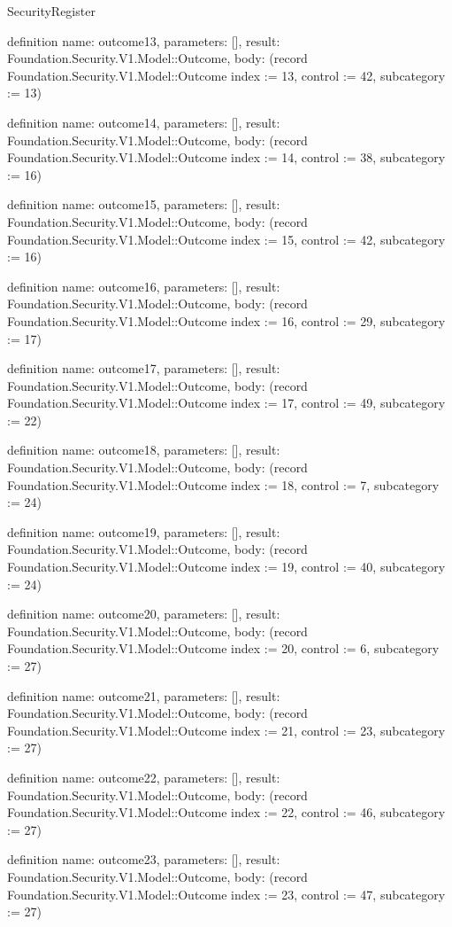 \begin{lexlean}{SecurityRegister}
\begin{semanticmodule}
definition{
  name: outcome13,
  parameters: [],
  result: Foundation.Security.V1.Model::Outcome,
  body: (record Foundation.Security.V1.Model::Outcome {index := 13, control := 42, subcategory := 13})
}

definition{
  name: outcome14,
  parameters: [],
  result: Foundation.Security.V1.Model::Outcome,
  body: (record Foundation.Security.V1.Model::Outcome {index := 14, control := 38, subcategory := 16})
}

definition{
  name: outcome15,
  parameters: [],
  result: Foundation.Security.V1.Model::Outcome,
  body: (record Foundation.Security.V1.Model::Outcome {index := 15, control := 42, subcategory := 16})
}

definition{
  name: outcome16,
  parameters: [],
  result: Foundation.Security.V1.Model::Outcome,
  body: (record Foundation.Security.V1.Model::Outcome {index := 16, control := 29, subcategory := 17})
}

definition{
  name: outcome17,
  parameters: [],
  result: Foundation.Security.V1.Model::Outcome,
  body: (record Foundation.Security.V1.Model::Outcome {index := 17, control := 49, subcategory := 22})
}

definition{
  name: outcome18,
  parameters: [],
  result: Foundation.Security.V1.Model::Outcome,
  body: (record Foundation.Security.V1.Model::Outcome {index := 18, control := 7, subcategory := 24})
}

definition{
  name: outcome19,
  parameters: [],
  result: Foundation.Security.V1.Model::Outcome,
  body: (record Foundation.Security.V1.Model::Outcome {index := 19, control := 40, subcategory := 24})
}

definition{
  name: outcome20,
  parameters: [],
  result: Foundation.Security.V1.Model::Outcome,
  body: (record Foundation.Security.V1.Model::Outcome {index := 20, control := 6, subcategory := 27})
}

definition{
  name: outcome21,
  parameters: [],
  result: Foundation.Security.V1.Model::Outcome,
  body: (record Foundation.Security.V1.Model::Outcome {index := 21, control := 23, subcategory := 27})
}

definition{
  name: outcome22,
  parameters: [],
  result: Foundation.Security.V1.Model::Outcome,
  body: (record Foundation.Security.V1.Model::Outcome {index := 22, control := 46, subcategory := 27})
}

definition{
  name: outcome23,
  parameters: [],
  result: Foundation.Security.V1.Model::Outcome,
  body: (record Foundation.Security.V1.Model::Outcome {index := 23, control := 47, subcategory := 27})
}


\end{semanticmodule}
\end{lexlean}
